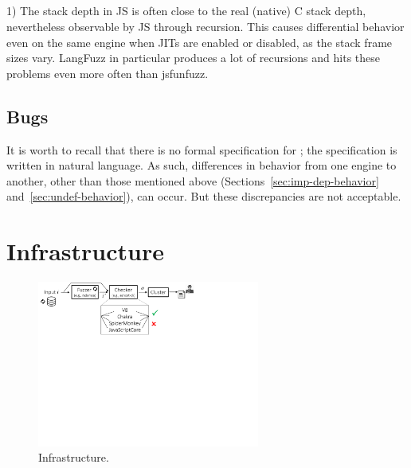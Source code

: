 \documentclass[10pt,conference,anonymous]{IEEEtran}
\begin{document}
\subsection{}

1) The stack depth in JS is often close to the real (native) C stack
depth, nevertheless observable by JS through recursion. This causes
differential behavior even on the same engine when JITs are enabled or
disabled, as the stack frame sizes vary. LangFuzz in particular
produces a lot of recursions and hits these problems even more often
than jsfunfuzz.

\subsection{Bugs}

It is worth to recall that there is no formal specification for \es{};
the specification is written in natural language. As such, differences
in behavior from one engine to another, other than those mentioned
above (Sections~\ref{sec:imp-dep-behavior}
and~\ref{sec:undef-behavior}), can occur. But these discrepancies are
not acceptable.


\section{Infrastructure}
\label{sec:design}


\begin{figure}[t]
  \centering
  \includegraphics[trim=0 350 0 0,clip,width=0.65\textwidth]{diff-testing-runtimes}
  \caption{\label{fig:workflow}Infrastructure.}
\end{figure}
\end{document}
